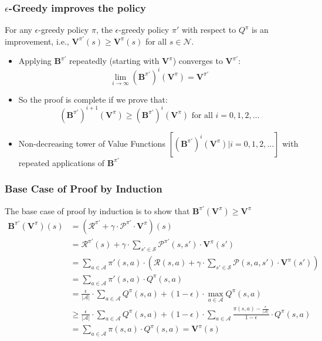 \documentclass[handout]{beamer}
\newcommand{\bvpi}{\bm{V}^{\pi}}
\begin{document}
\begin{frame}
\frametitle{$\epsilon$-Greedy improves the policy}
\pause
\begin{theorem}
For any $\epsilon$-greedy policy $\pi$, the $\epsilon$-greedy policy $\pi'$ with respect to $Q^{\pi}$ is an improvement, i.e., $\bm{V}^{\pi'}(s) \geq \bm{V}^{\pi}(s)$ for all $s \in \mathcal{N}$.
\end{theorem}
\pause
\begin{itemize}[<+->]
\item Applying $\bm{B}^{\pi'}$ repeatedly (starting with $\bvpi$) converges to $\bm{V}^{\pi'}$:
$$\lim_{i\rightarrow \infty} (\bm{B}^{\pi'})^i(\bvpi) = \bm{V}^{\pi'}$$
\item So the proof is complete if we prove that:
$$(\bm{B}^{\pi'})^{i+1}(\bvpi) \geq (\bm{B}^{\pi'})^i(\bvpi) \text{ for all } i = 0, 1, 2, \ldots$$
\item Non-decreasing tower of Value Functions $[(\bm{B}^{\pi'})^i(\bvpi)|i = 0, 1, 2, \ldots]$ with repeated applications of $\bm{B}^{\pi'}$
\end{itemize}
\end{frame}

\begin{frame}
\frametitle{Base Case of Proof by Induction}
\pause
The base case of proof by induction is to show that $\bm{B}^{\pi'}(\bvpi)  \geq  \bm{V}^{\pi}$
\pause
\begin{align*}
\bm{B}^{\pi'}(\bvpi)(s) & = (\bm{\mathcal{R}}^{\pi'} + \gamma \cdot \bm{\mathcal{P}}^{\pi'} \cdot \bvpi)(s) \\
& = \bm{\mathcal{R}}^{\pi'}(s) + \gamma \cdot \sum_{s' \in \mathcal{S}} \bm{\mathcal{P}}^{\pi'}(s,s') \cdot \bvpi(s') \\
& = \sum_{a \in \mathcal{A}} \pi'(s, a) \cdot (\mathcal{R}(s,a) + \gamma \cdot \sum_{s' \in \mathcal{S}} \mathcal{P}(s,a,s') \cdot \bvpi(s')) \\
& = \sum_{a \in \mathcal{A}} \pi'(s, a) \cdot Q^{\pi}(s,a) \\
& = \frac {\epsilon} {|\mathcal{A}|} \cdot \sum_{a \in \mathcal{A}} Q^{\pi}(s,a) + (1 - \epsilon) \cdot \max_{a \in \mathcal{A}} Q^{\pi}(s,a) \\
& \geq \frac {\epsilon} {|\mathcal{A}|} \cdot \sum_{a \in \mathcal{A}} Q^{\pi}(s,a) + (1 - \epsilon) \cdot \sum_{a \in \mathcal{A}} \frac {\pi(s,a) - \frac {\epsilon} {|\mathcal{A}|}} {1 - \epsilon} \cdot Q^{\pi}(s,a) \\
& = \sum_{a \in \mathcal{A}} \pi(s,a) \cdot Q^{\pi}(s,a) = \bm{V}^{\pi}(s)
\end{align*}
\end{frame}
\end{document}
